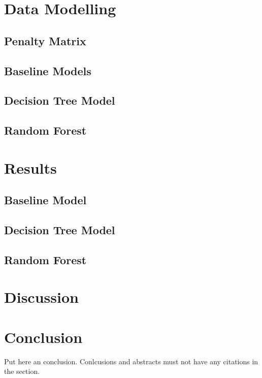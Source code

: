 \documentclass[sigconf]{acmart}
\begin{document}
\section{Data Modelling}

\subsection{Penalty Matrix}

\subsection{Baseline Models}

\subsection{Decision Tree Model}

\subsection{Random Forest}

\section{Results}

\subsection{Baseline Model}

\subsection{Decision Tree Model}

\subsection{Random Forest}

\section{Discussion}


\section{Conclusion}

Put here an conclusion. Conlcusions and abstracts must not have any
citations in the section.
\end{document}
